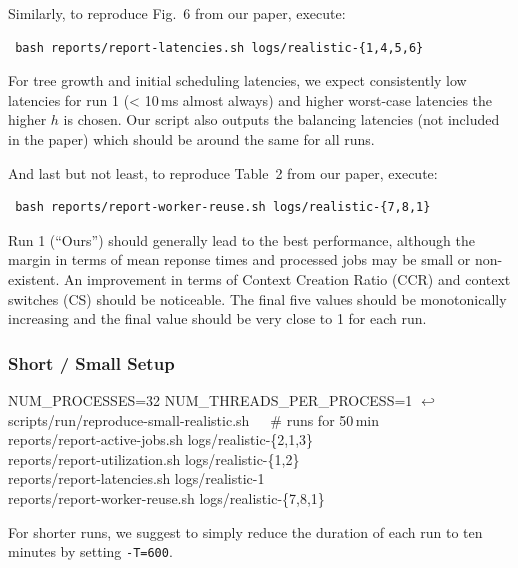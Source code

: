 \documentclass[runningheads]{article}
\newcommand{\CR}{{\tiny$\hookleftarrow$}}
\numberwithin{dummy}{subsection}
\begin{document}
Similarly, to reproduce Fig.~6 from our paper, execute:
\begin{verbatim}
 bash reports/report-latencies.sh logs/realistic-{1,4,5,6}
\end{verbatim}
For tree growth and initial scheduling latencies, we expect consistently low latencies for run 1 (< 10\,ms almost always) and higher worst-case latencies the higher $h$ is chosen.
Our script also outputs the balancing latencies (not included in the paper) which should be around the same for all runs.

And last but not least, to reproduce Table~2 from our paper, execute:
\begin{verbatim}
 bash reports/report-worker-reuse.sh logs/realistic-{7,8,1}
\end{verbatim}
Run 1 (``Ours'') should generally lead to the best performance, although the margin in terms of mean reponse times and processed jobs may be small or non-existent.
An improvement in terms of Context Creation Ratio (CCR) and context switches (CS) should be noticeable.
The final five values should be monotonically increasing and the final value should be very close to 1 for each run.

\subsubsection{Short / Small Setup}

\begin{tcolorbox}[
  colback=Magenta!5!white,
  colframe=Magenta!75!black,
  title={\centering Commands for Small Setup}]
\begin{ttfenvcompact}
NUM\_PROCESSES=32 NUM\_THREADS\_PER\_PROCESS=1 \CR\\
\hspace*{0.3cm}scripts/run/reproduce-small-realistic.sh\ \ \ \# runs for 50\,min\\
reports/report-active-jobs.sh logs/realistic-\{2,1,3\}\\
reports/report-utilization.sh logs/realistic-\{1,2\}\\
reports/report-latencies.sh logs/realistic-1\\
reports/report-worker-reuse.sh logs/realistic-\{7,8,1\}
\end{ttfenvcompact}
\end{tcolorbox}

For shorter runs, we suggest to simply reduce the duration of each run to ten minutes by setting \texttt{-T=600}.
\end{document}
